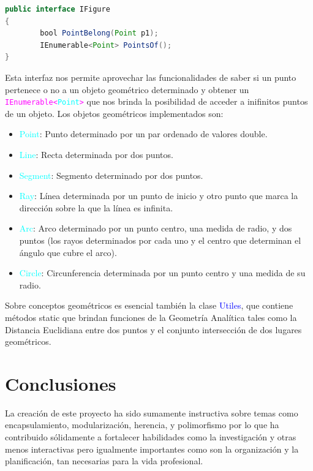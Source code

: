 \documentclass[a4paper, 12pt]{article}
\begin{document}
\begin{lstlisting}[language= Java]
 public interface IFigure
{
        bool PointBelong(Point p1);
        IEnumerable<Point> PointsOf();
}
\end{lstlisting}
Esta interfaz nos permite aprovechar las funcionalidades de saber si un punto pertenece o no a un objeto geométrico determinado y obtener un \textcolor{magenta}{\texttt{IEnumerable<\textcolor{cyan}{Point}>}} que nos brinda la posibilidad de acceder a inifinitos puntos de un objeto.
Los objetos geométricos implementados son:
\begin{itemize}
\item \textcolor{cyan}{Point}: Punto determinado por un par ordenado de valores double.
\item \textcolor{cyan}{Line}: Recta determinada por dos puntos.
\item \textcolor{cyan}{Segment}: Segmento determinado por dos puntos.
\item \textcolor{cyan}{Ray}: Línea determinada por un punto de inicio y otro punto que marca la dirección sobre la que la línea es infinita.
\item \textcolor{cyan}{Arc}: Arco determinado por un punto centro, una medida de radio, y dos puntos (los rayos determinados por cada uno y el centro que determinan el ángulo que cubre el arco).
\item  \textcolor{cyan}{Circle}: Circunferencia determinada por un punto centro y una medida de su radio.
\end{itemize}

Sobre conceptos geométricos es esencial también la clase  \textcolor{blue}{Utiles}, que contiene métodos static que brindan funciones de la Geometría Analítica tales como la Distancia Euclidiana entre dos puntos y el conjunto intersección de dos lugares geométricos.

\section{Conclusiones}\label{sec:concl}
La creación de este proyecto ha sido sumamente instructiva sobre temas como encapsulamiento, modularización, herencia, y polimorfismo por lo que  ha contribuido sólidamente a fortalecer habilidades como la investigación y otras menos interactivas pero igualmente importantes como son la organización y la planificación, tan necesarias para la vida profesional.
\end{document}
